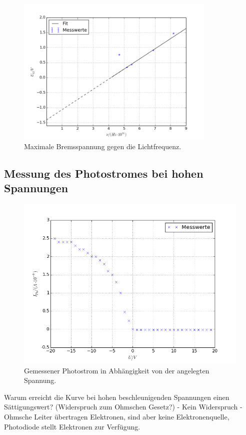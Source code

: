 \begin{figure}[p]
	\centering
	\includegraphics[width=0.85\textwidth]{Bilder/unu_diag.png}
	\caption{Maximale Bremsspannung gegen die Lichtfrequenz.}
	\label{fig:unu}
\end{figure}

\subsection{Messung des Photostromes bei hohen Spannungen}

\begin{figure}[h]
	\centering
	\includegraphics[width=\textwidth]{Bilder/messung2.png}
	\caption{Gemessener Photostrom in Abhängigkeit von der angelegten Spannung.}
	\label{fig:uidiagramm3}
\end{figure}
Warum erreicht die Kurve bei hohen beschleunigenden Spannungen einen Sättigungswert? 
(Widerspruch zum Ohmschen Gesetz?) 
- Kein Widerspruch
- Ohmsche Leiter übertragen Elektronen, sind aber keine Elektronenquelle,
  Photodiode stellt Elektronen zur Verfügung.

